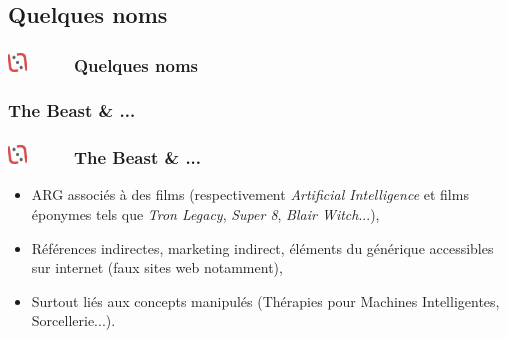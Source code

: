 \documentclass[slidetop,11pt]{beamer}
\def\moreInFrameTitleLeftt{\includegraphics[height=0.5cm]{img/ligueludique-0.png}~~~~~}
\begin{document}
\def\sectionPartIIa{Quelques noms}
\subsection{\sectionPartIIa}
\begin{frame}
	\frametitle{\moreInFrameTitleLeftt \sectionPartIIa }
	\tableofcontents[sections=2,currentsection,subsectionstyle=show/shaded/hide]
\end{frame} 


\def\sectionPartIIaII{The Beast \& ... }
\subsubsection{\sectionPartIIaII}
\begin{frame}
	\frametitle{\moreInFrameTitleLeftt \sectionPartIIaII }
	\begin{itemize}
		\item ARG associ{\'e}s {\`a} des films (respectivement \emph{Artificial Intelligence} et films {\'e}ponymes tels que \emph{Tron Legacy}, \emph{Super 8}, \emph{Blair Witch}...), 
		\item R{\'e}f{\'e}rences indirectes, marketing indirect, {\'e}l{\'e}ments du g{\'e}n{\'e}rique accessibles sur internet (faux sites web notamment), 
		\item Surtout li{\'e}s aux concepts manipul{\'e}s (Th{\'e}rapies pour Machines Intelligentes, Sorcellerie...). 
	\end{itemize}
\end{frame} 

\def\sectionPartIIaIII{The Lost Experience}
\end{document}
